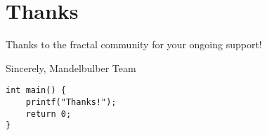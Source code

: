 \section{Thanks}

Thanks to the fractal community for your ongoing support!

Sincerely,
Mandelbulber Team

\begin{verbatim}
int main() {
	printf("Thanks!");
	return 0;
}
\end{verbatim}
